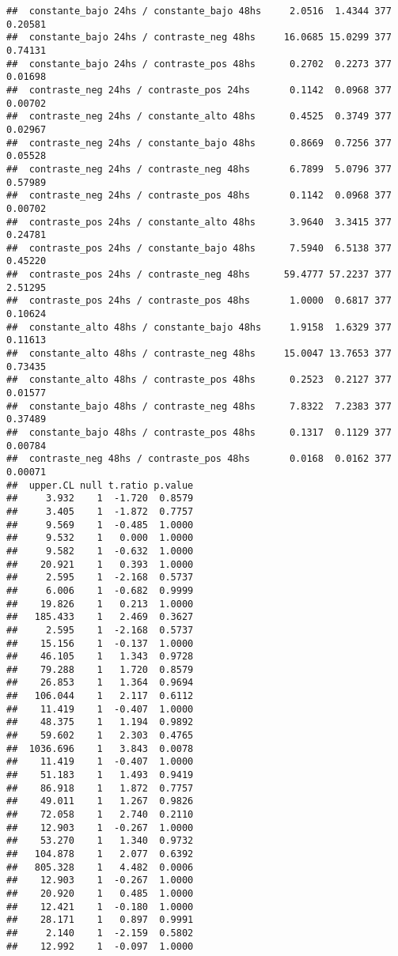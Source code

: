 \documentclass[
]{article}
\begin{document}
\begin{verbatim}
##  constante_bajo 24hs / constante_bajo 48hs     2.0516  1.4344 377  0.20581
##  constante_bajo 24hs / contraste_neg 48hs     16.0685 15.0299 377  0.74131
##  constante_bajo 24hs / contraste_pos 48hs      0.2702  0.2273 377  0.01698
##  contraste_neg 24hs / contraste_pos 24hs       0.1142  0.0968 377  0.00702
##  contraste_neg 24hs / constante_alto 48hs      0.4525  0.3749 377  0.02967
##  contraste_neg 24hs / constante_bajo 48hs      0.8669  0.7256 377  0.05528
##  contraste_neg 24hs / contraste_neg 48hs       6.7899  5.0796 377  0.57989
##  contraste_neg 24hs / contraste_pos 48hs       0.1142  0.0968 377  0.00702
##  contraste_pos 24hs / constante_alto 48hs      3.9640  3.3415 377  0.24781
##  contraste_pos 24hs / constante_bajo 48hs      7.5940  6.5138 377  0.45220
##  contraste_pos 24hs / contraste_neg 48hs      59.4777 57.2237 377  2.51295
##  contraste_pos 24hs / contraste_pos 48hs       1.0000  0.6817 377  0.10624
##  constante_alto 48hs / constante_bajo 48hs     1.9158  1.6329 377  0.11613
##  constante_alto 48hs / contraste_neg 48hs     15.0047 13.7653 377  0.73435
##  constante_alto 48hs / contraste_pos 48hs      0.2523  0.2127 377  0.01577
##  constante_bajo 48hs / contraste_neg 48hs      7.8322  7.2383 377  0.37489
##  constante_bajo 48hs / contraste_pos 48hs      0.1317  0.1129 377  0.00784
##  contraste_neg 48hs / contraste_pos 48hs       0.0168  0.0162 377  0.00071
##  upper.CL null t.ratio p.value
##     3.932    1  -1.720  0.8579
##     3.405    1  -1.872  0.7757
##     9.569    1  -0.485  1.0000
##     9.532    1   0.000  1.0000
##     9.582    1  -0.632  1.0000
##    20.921    1   0.393  1.0000
##     2.595    1  -2.168  0.5737
##     6.006    1  -0.682  0.9999
##    19.826    1   0.213  1.0000
##   185.433    1   2.469  0.3627
##     2.595    1  -2.168  0.5737
##    15.156    1  -0.137  1.0000
##    46.105    1   1.343  0.9728
##    79.288    1   1.720  0.8579
##    26.853    1   1.364  0.9694
##   106.044    1   2.117  0.6112
##    11.419    1  -0.407  1.0000
##    48.375    1   1.194  0.9892
##    59.602    1   2.303  0.4765
##  1036.696    1   3.843  0.0078
##    11.419    1  -0.407  1.0000
##    51.183    1   1.493  0.9419
##    86.918    1   1.872  0.7757
##    49.011    1   1.267  0.9826
##    72.058    1   2.740  0.2110
##    12.903    1  -0.267  1.0000
##    53.270    1   1.340  0.9732
##   104.878    1   2.077  0.6392
##   805.328    1   4.482  0.0006
##    12.903    1  -0.267  1.0000
##    20.920    1   0.485  1.0000
##    12.421    1  -0.180  1.0000
##    28.171    1   0.897  0.9991
##     2.140    1  -2.159  0.5802
##    12.992    1  -0.097  1.0000

\end{verbatim}
\end{document}
